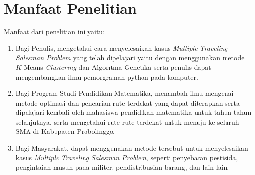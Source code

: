 
\section{Manfaat Penelitian}

Manfaat dari penelitian ini yaitu:
\begin{enumerate}
	\item Bagi Penulis, mengetahui cara menyelesaikan kasus \textit{Multiple Traveling Salesman Problem} yang telah dipelajari yaitu dengan menggunakan metode $K$-Means \textit{Clustering} dan Algoritma Genetika serta penulis dapat mengembangkan ilmu pemorgraman python pada komputer.

	\item Bagi Program Studi Pendidikan Matematika, menambah ilmu mengenai metode optimasi dan pencarian rute terdekat yang dapat diterapkan serta dipelajari kembali oleh mahasiswa pendidikan matematika untuk tahun-tahun selanjutnya, serta mengetahui rute-rute terdekat untuk menuju ke seluruh SMA di Kabupaten Probolinggo.
	
	\item Bagi Masyarakat, dapat menggunakan metode tersebut untuk menyelesaikan kasus \textit{Multiple Traveling Salesman Problem}, seperti penyebaran pestisida, pengintaian musuh pada militer, pendistribusian barang, dan lain-lain.
	
\end{enumerate}
